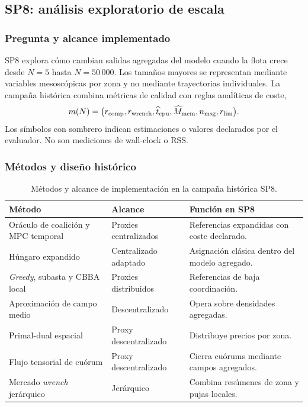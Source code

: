 \subsection{SP8: análisis exploratorio de escala}
\label{sec:resultados-sp8}

\subsubsection{Pregunta y alcance implementado}

SP8 explora cómo cambian salidas agregadas del modelo cuando la flota crece desde $N=5$ hasta $N=50\,000$. Los tamaños mayores se representan mediante variables mesoscópicas por zona y no mediante trayectorias individuales. La campaña histórica combina métricas de calidad con reglas analíticas de coste,
\[
 m(N)=\bigl(r_{\rm comp},r_{\rm wrench},\widehat t_{\rm cpu},
 \widehat M_{\rm mem},n_{\rm msg},r_{\rm lim}\bigr).
\]
Los símbolos con sombrero indican estimaciones o valores declarados por el evaluador. No son mediciones de wall-clock o RSS.



\subsubsection{Métodos y diseño histórico}

\begin{table}[H]
\centering
\scriptsize
\begin{tabularx}{\textwidth}{@{}p{}p{}X@{}}
\toprule
Método & Alcance & Función en SP8 \\
\midrule
Oráculo de coalición y MPC temporal & Proxies centralizados & Referencias expandidas con coste declarado. \\
Húngaro expandido & Centralizado adaptado & Asignación clásica dentro del modelo agregado. \\
\emph{Greedy}, subasta y CBBA local & Proxies distribuidos & Referencias de baja coordinación. \\
Aproximación de campo medio & Descentralizado & Opera sobre densidades agregadas. \\
Primal-dual espacial & Proxy descentralizado & Distribuye precios por zona. \\
Flujo tensorial de cuórum & Proxy descentralizado & Cierra cuórums mediante campos agregados. \\
Mercado \emph{wrench} jerárquico & Jerárquico & Combina resúmenes de zona y pujas locales. \\
\bottomrule
\end{tabularx}
\caption{Métodos y alcance de implementación en la campaña histórica SP8.}
\label{tab:sp8-methods}
\end{table}

